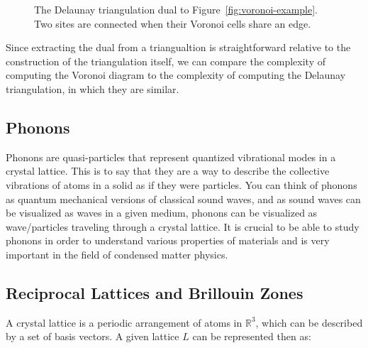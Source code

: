 \documentclass{article}
\begin{document}
\begin{figure}[H]
\centering
{}
\caption{The Delaunay triangulation dual to Figure~\ref{fig:voronoi-example}. Two sites are connected when their Voronoi cells share an edge.}
\label{fig:delaunay-example}
\end{figure}

Since extracting the dual from a triangualtion is straightforward relative to the construction of the triangulation itself, we can compare the complexity of computing the Voronoi diagram to the complexity of computing the Delaunay triangulation, in which they are similar.

\subsection{Phonons}
Phonons are quasi-particles that represent quantized vibrational modes in a crystal lattice. This is to say that they are a way to describe the collective vibrations of atoms in a solid as if they were particles. You can think of phonons as quantum mechanical versions of classical sound waves, and as sound waves can be visualized as waves in a given medium, phonons can be visualized as wave/particles traveling through a crystal lattice. It is crucial to be able to study phonons in order to understand various properties of materials and is very important in the field of condensed matter physics.

\subsection{Reciprocal Lattices and Brillouin Zones}
A crystal lattice is a periodic arrangement of atoms in $\mathbb{R}^3$, which can be described by a set of basis vectors. A given lattice $L$ can be represented then as:
\end{document}
